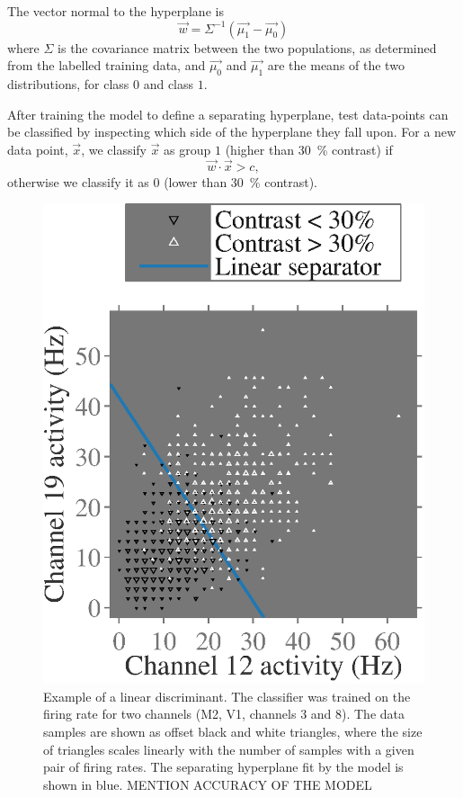 The vector normal to the hyperplane is 
\begin{equation}
\vec{w} = \Sigma^{-1}\left(\vec{\mu_1}-\vec{\mu_0}\right)
\end{equation}
where $\Sigma$ is the covariance matrix between the two populations, as determined from the labelled training data, and $\vec{\mu_0}$ and $\vec{\mu_1}$ are the means of the two distributions, for class $0$ and class $1$.

After training the model to define a separating hyperplane, test data-points can be classified by inspecting which side of the hyperplane they fall upon.
For a new data point, $\vec{x}$, we classify $\vec{x}$ as group $1$ (higher than \SI{30}{\percent} contrast) if
\begin{equation}
\vec{w}\cdot\vec{x}>c
,\end{equation}
otherwise we classify it as $0$ (lower than \SI{30}{\percent} contrast).

\begin{figure}[htbp]
    \centering
    \includegraphics[scale=.45]{figs/decoding/lindiscrimex_v1_jack_72_3vs8.eps}
    \caption{%
    Example of a linear discriminant.
    The classifier was trained on the firing rate for two channels (\ac{M2}, \ac{V1}, channels \num{3} and \num{8}).
    The data samples are shown as offset black and white triangles, where the size of triangles scales linearly with the number of samples with a given pair of firing rates.
    The separating hyperplane fit by the model is shown in blue.
    MENTION ACCURACY OF THE MODEL
}
    \label{fig:pl_lin_discrim_example}
\end{figure}


